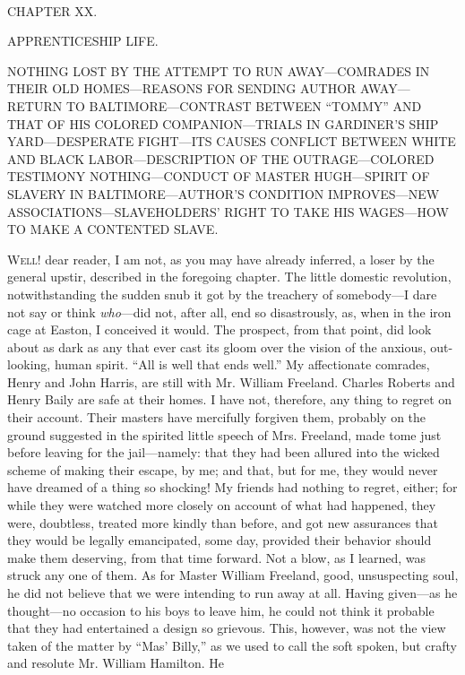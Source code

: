 {}

~

{CHAPTER XX.}

APPRENTICESHIP LIFE.

{NOTHING LOST BY THE ATTEMPT TO RUN AWAY---COMRADES IN THEIR OLD
HOMES---REASONS FOR SENDING AUTHOR AWAY---RETURN TO BALTIMORE---CONTRAST
BETWEEN ``TOMMY'' AND THAT OF HIS COLORED COMPANION---TRIALS IN
GARDINER'S SHIP YARD---DESPERATE FIGHT---ITS CAUSES CONFLICT BETWEEN
WHITE AND BLACK LABOR---DESCRIPTION OF THE OUTRAGE---COLORED TESTIMONY
NOTHING---CONDUCT OF MASTER HUGH---SPIRIT OF SLAVERY IN
BALTIMORE---AUTHOR'S CONDITION IMPROVES---NEW
ASSOCIATIONS---SLAVEHOLDERS' RIGHT TO TAKE HIS WAGES---HOW TO MAKE A
CONTENTED SLAVE.}

\textsc{Well!} dear reader, I am not, as you may have already inferred,
a loser by the general upstir, described in the foregoing chapter. The
little domestic revolution, notwithstanding the sudden snub it got by
the treachery of somebody---I dare not say or think \emph{who}---did
not, after all, end so disastrously, as, when in the iron cage at
Easton, I conceived it would. The prospect, from that point, did look
about as dark as any that ever cast its gloom over the vision of the
anxious, out-looking, human spirit. ``All is well that ends well.'' My
affectionate comrades, Henry and John Harris, are still with Mr. William
Freeland. Charles Roberts and Henry Baily are safe at their homes. I
have not, therefore, any thing to regret on their account. Their masters
have mercifully forgiven them, probably on the ground suggested in the
spirited little speech of Mrs. Freeland, made tome just before {}leaving
for the jail---namely: that they had been allured into the wicked scheme
of making their escape, by me; and that, but for me, they would never
have dreamed of a thing so shocking! My friends had nothing to regret,
either; for while they were watched more closely on account of what had
happened, they were, doubtless, treated more kindly than before, and got
new assurances that they would be legally emancipated, some day,
provided their behavior should make them deserving, from that time
forward. Not a blow, as I learned, was struck any one of them. As for
Master William Freeland, good, unsuspecting soul, he did not believe
that we were intending to run away at all. Having given---as he
thought---no occasion to his boys to leave him, he could not think it
probable that they had entertained a design so grievous. This, however,
was not the view taken of the matter by ``Mas' Billy,'' as we used to
call the soft spoken, but crafty and resolute Mr. William Hamilton. He
